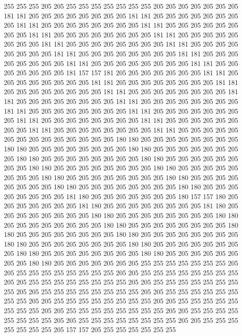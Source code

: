 255 255 255 205 205 255 255 255 255 255 255 255 205 205 205 205 205 205 205 181
181 205 205 205 205 205 205 205 205 181 181 205 205 205 205 205 205 205 205 181
181 205 205 205 205 205 205 205 205 181 181 205 205 205 205 205 205 205 205 181
181 205 205 205 205 205 205 205 205 181 181 205 205 205 205 205 205 205 205 181
181 205 205 205 205 205 205 205 205 181 181 205 205 205 205 205 205 205 205 181
181 205 205 205 205 205 205 205 205 181 181 205 205 205 205 205 205 205 205 181
181 205 205 205 205 205 205 205 205 181 181 205 205 205 205 205 205 205 181 157
157 181 205 205 205 205 205 205 205 181 181 205 205 205 205 205 205 205 205 181
181 205 205 205 205 205 205 205 205 181 181 205 205 205 205 205 205 205 205 181
181 205 205 205 205 205 205 205 205 181 181 205 205 205 205 205 205 205 205 181
181 205 205 205 205 205 205 205 205 181 181 205 205 205 205 205 205 205 205 181
181 205 205 205 205 205 205 205 205 181 181 205 205 205 205 205 205 205 205 181
181 205 205 205 205 205 205 205 205 181 181 205 205 205 205 205 205 205 205 181
181 205 205 205 205 205 205 205 205 205 205 205 205 205 205 180 180 205 205 205
205 205 205 205 205 180 180 205 205 205 205 205 205 205 205 180 180 205 205 205
205 205 205 205 205 180 180 205 205 205 205 205 205 205 205 180 180 205 205 205
205 205 205 205 205 180 180 205 205 205 205 205 205 205 205 180 180 205 205 205
205 205 205 205 205 180 180 205 205 205 205 205 205 205 205 180 180 205 205 205
205 205 205 205 205 180 180 205 205 205 205 205 205 205 205 180 180 205 205 205
205 205 205 205 205 181 180 205 205 205 205 205 205 205 180 157 157 180 205 205
205 205 205 205 205 181 180 205 205 205 205 205 205 205 205 181 180 205 205 205
205 205 205 205 205 180 180 205 205 205 205 205 205 205 205 180 180 205 205 205
205 205 205 205 205 180 180 205 205 205 205 205 205 205 205 180 180 205 205 205
205 205 205 205 205 180 180 205 205 205 205 205 205 205 205 180 180 205 205 205
205 205 205 205 205 180 180 205 205 205 205 205 205 205 205 180 180 205 205 205
205 205 205 205 205 180 180 205 205 205 205 205 205 205 205 180 180 205 205 205
205 205 205 205 255 255 255 255 255 255 255 205 205 255 255 255 255 255 255 255
255 205 205 255 255 255 255 255 255 255 255 205 205 255 255 255 255 255 255 255
255 205 205 255 255 255 255 255 255 255 255 205 205 255 255 255 255 255 255 255
255 205 205 255 255 255 255 255 255 255 255 205 205 255 255 255 255 255 255 255
255 205 205 255 255 255 255 255 255 255 255 205 205 255 255 255 255 255 255 255
255 205 205 255 255 255 255 255 255 255 255 205 205 255 255 255 255 255 255 255
255 205 205 255 255 255 255 255 255 255 205 157 157 205 255 255 255 255 255 255
